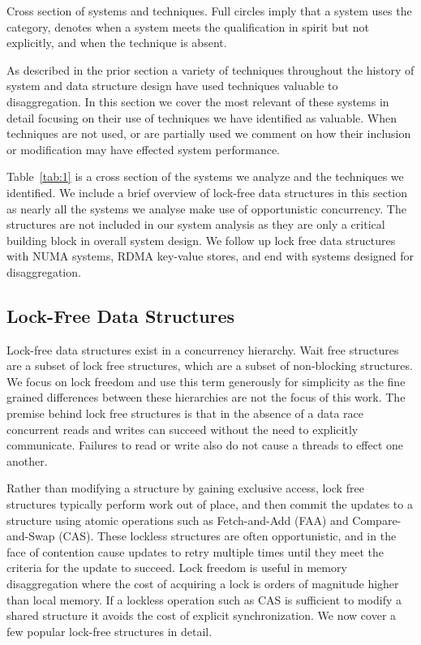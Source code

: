 \begin{table}[h]
    \caption{Cross section of systems and techniques. Full circles
    \fullcirc imply that a system uses the category, \halfcirc denotes when a
    system meets the qualification in spirit but not explicitly, and \nullcirc
    when the technique is absent.}
    
    \label{tab:1}
\end{table}

As described in the prior section a variety of techniques throughout the history
of system and data structure design have used techniques valuable to
disaggregation. In this section we cover the most relevant of these systems in
detail focusing on their use of techniques we have identified as valuable. When
techniques are not used, or are partially used we comment on how their inclusion
or modification may have effected system performance.

Table~\ref{tab:1} is a cross section of the systems we analyze and the techniques
we identified. We include a brief overview of lock-free data structures in this
section as nearly all the systems we analyse make use of opportunistic
concurrency. The structures are not included in our system analysis as they are
only a critical building block in overall system design. We follow up lock free
data structures with NUMA systems, RDMA key-value stores, and end with systems
designed for disaggregation.

\subsection{Lock-Free Data Structures}

Lock-free data structures exist in a concurrency hierarchy. Wait free structures are
a subset of lock free structures, which are a subset of non-blocking structures.
We focus on lock freedom and use this term generously for simplicity as the fine
grained differences between these hierarchies are not the focus of this work.
The premise behind lock free structures is that in the absence of a data race
concurrent reads and writes can succeed without the need to explicitly
communicate. Failures to read or write also do not cause a threads to effect one
another.

Rather than modifying a structure by gaining exclusive access, lock free
structures typically perform work out of place, and then commit the updates to a
structure using atomic operations such as Fetch-and-Add (FAA) and
Compare-and-Swap (CAS). These lockless structures are often opportunistic, and
in the face of contention cause updates to retry multiple times until they meet
the criteria for the update to succeed. Lock freedom is useful in memory
disaggregation where the cost of acquiring a lock is orders of magnitude higher
than local memory. If a lockless operation such as CAS is sufficient to modify a
shared structure it avoids the cost of explicit synchronization. We now cover a
few popular lock-free structures in detail.

